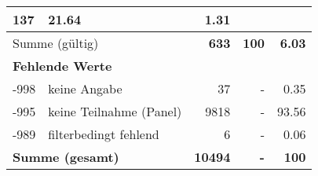 \begin{longtable}{lXrrr}
       \num{137} &
       \num[round-mode=places,round-precision=2]{21,64} &
         \num[round-mode=places,round-precision=2]{1,31} \\
     \midrule
     \multicolumn{2}{l}{Summe (gültig)} &
       \textbf{\num{633}} &
     \textbf{100} &
       \textbf{\num[round-mode=places,round-precision=2]{6,03}} \\
     \multicolumn{5}{l}{\textbf{Fehlende Werte}}\\
       -998 &
       keine Angabe &
         \num{37} &
        - &
         \num[round-mode=places,round-precision=2]{0,35} \\
       -995 &
       keine Teilnahme (Panel) &
         \num{9818} &
        - &
         \num[round-mode=places,round-precision=2]{93,56} \\
       -989 &
       filterbedingt fehlend &
         \num{6} &
        - &
         \num[round-mode=places,round-precision=2]{0,06} \\
     \midrule
     \multicolumn{2}{l}{\textbf{Summe (gesamt)}} &
          \textbf{\num{10494}} &
        \textbf{-} &
        \textbf{100} \\
     \bottomrule
     \end{longtable}
     
